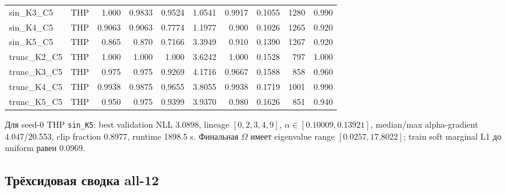 \documentclass[11pt,a4paper]{article}
\newcommand{\code}[1]{\texttt{#1}}
\begin{document}
\begin{landscape}
\begin{longtable}{llrrrrrrrr}
sin\_K3\_C5 & THP & 1.000 & 0.9833 & 0.9524 & 1.0541 & 0.9917 & 0.1055 & 1280 & 0.990 \\
sin\_K4\_C5 & THP & 0.9063 & 0.9063 & 0.7774 & 1.1977 & 0.900 & 0.1026 & 1265 & 0.920 \\
sin\_K5\_C5 & THP & 0.865 & 0.870 & 0.7166 & 3.3949 & 0.910 & 0.1390 & 1267 & 0.920 \\
trunc\_K2\_C5 & THP & 1.000 & 1.000 & 1.000 & 3.6242 & 1.000 & 0.1528 & 797 & 1.000 \\
trunc\_K3\_C5 & THP & 0.975 & 0.975 & 0.9269 & 4.1716 & 0.9667 & 0.1588 & 858 & 0.960 \\
trunc\_K4\_C5 & THP & 0.9938 & 0.9875 & 0.9655 & 3.8055 & 0.9938 & 0.1719 & 1001 & 0.990 \\
trunc\_K5\_C5 & THP & 0.950 & 0.975 & 0.9399 & 3.9370 & 0.980 & 0.1626 & 851 & 0.940 \\
\bottomrule
\end{longtable}
\end{landscape}

Для seed-0 THP \code{sin\_K5}: best validation NLL 3.0898, lineage
$[0,2,3,4,9]$, $\alpha\in[0.10009,0.13921]$, median/max alpha-gradient
4.047/20.553, clip fraction 0.8977, runtime 1898.5 s. Финальная $\Omega$
имеет eigenvalue range $[0.0257,17.8022]$; train soft marginal L1 до uniform
равен 0.0969.

\subsection{Трёхсидовая сводка all-12}
\end{document}
